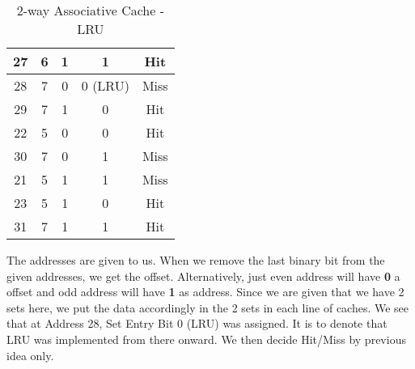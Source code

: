 \documentclass[12pt]{article}
\begin{document}
\begin{table}
\begin{tabular}{|c|c|c|c|c|}
\hline
27                & 6                  & 1                                                                              & 1                                                                          & Hit                 \\ 
\hline
28                & 7                  & 0                                                                              & 0 (LRU)                                                                    & Miss                \\ 
\hline
29                & 7                  & 1                                                                              & 0                                                                          & Hit                 \\ 
\hline
22                & 5                  & 0                                                                              & 0                                                                          & Hit                 \\ 
\hline
30                & 7                  & 0                                                                              & 1                                                                          & Miss                \\ 
\hline
21                & 5                  & 1                                                                              & 1                                                                          & Miss                \\ 
\hline
23                & 5                  & 1                                                                              & 0                                                                          & Hit                 \\ 
\hline
31                & 7                  & 1                                                                              & 1                                                                          & Hit                 \\
\hline
\end{tabular}
\caption{2-way Associative Cache - LRU}
\end{table}

The addresses are given to us. When we remove the last binary bit from the given addresses, we get the offset. Alternatively, just even address will have \textbf{0} a offset and odd address will have \textbf{1} as address. Since we are given that we have 2 sets here, we put the data accordingly in the 2 sets in each line of caches. We see that at Address 28, Set Entry Bit 0 (LRU) was assigned. It is to denote that LRU was implemented from there onward. We then decide Hit/Miss by previous idea only. \\
\end{document}
